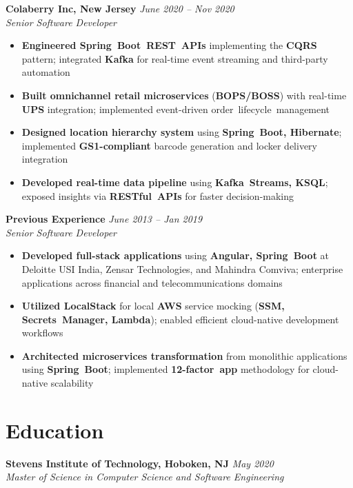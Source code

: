 \documentclass[11pt,a4paper]{article}
\newcommand{\resumeItem}[1]{\item\small{#1}}
\newcommand{\resumeItemList}[1]{\begin{itemize}[leftmargin=0.5in, itemsep=0.25em, parsep=0pt, partopsep=0pt, topsep=0.25em]
    \small
    #1
\end{itemize}}
\begin{document}
\textbf{Colaberry Inc, New Jersey} \hfill \textit{June 2020 -- Nov 2020}\\
\textit{Senior Software Developer}
\resumeItemList{
    \resumeItem{\textbf{Engineered Spring~Boot~REST~APIs} implementing the \textbf{CQRS} pattern; integrated \textbf{Kafka} for real-time event streaming and third-party automation}
    \resumeItem{\textbf{Built omnichannel retail microservices} (\textbf{BOPS/BOSS}) with real-time \textbf{UPS} integration; implemented event-driven order~lifecycle~management}
    \resumeItem{\textbf{Designed location hierarchy system} using \textbf{Spring~Boot, Hibernate}; implemented \textbf{GS1-compliant} barcode generation and locker delivery integration}
    \resumeItem{\textbf{Developed real-time data pipeline} using \textbf{Kafka~Streams, KSQL}; exposed insights via \textbf{RESTful~APIs} for faster decision-making}
}
\vspace{0.4em}

\textbf{Previous Experience} \hfill \textit{June 2013 -- Jan 2019}\\
\textit{Senior Software Developer}
\resumeItemList{
    \resumeItem{\textbf{Developed full-stack applications} using \textbf{Angular, Spring~Boot} at Deloitte USI India, Zensar Technologies, and Mahindra Comviva; enterprise applications across financial and telecommunications domains}
    \resumeItem{\textbf{Utilized \textbf{LocalStack}} for local \textbf{AWS} service mocking (\textbf{SSM, Secrets~Manager, Lambda}); enabled efficient cloud-native development workflows}
    \resumeItem{\textbf{Architected microservices transformation} from monolithic applications using \textbf{Spring~Boot}; implemented \textbf{12-factor~app} methodology for cloud-native scalability}
}

\section{Education}
\textbf{Stevens Institute of Technology, Hoboken, NJ} \hfill \textit{May 2020}\\
\textit{Master of Science in Computer Science and Software Engineering}
\end{document}
